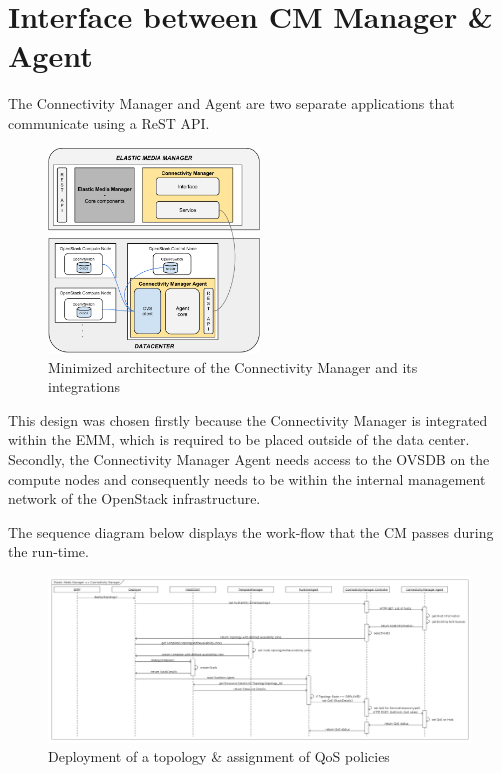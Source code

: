 \section{Interface between CM Manager \& Agent}

The Connectivity Manager and Agent are two separate applications that communicate using a ReST API. 

\begin{figure}[H]
\centering

\includegraphics[width=0.5\textwidth]{images/design/modular_architecture_cm_cma}

\caption{Minimized architecture of the Connectivity Manager and its integrations}
\end{figure}

This design was chosen firstly because the Connectivity Manager is integrated within the EMM, which is required to be placed outside of the data center. Secondly, the Connectivity Manager Agent needs access to the OVSDB on the compute nodes and consequently needs to be within the internal management network of the OpenStack infrastructure.

The sequence diagram below displays the work-flow that the CM passes during the run-time.

\begin{figure}[H]
\centering

\includegraphics[width=\textwidth]{images/design/sequence_diagram}

\caption{Deployment of a topology \& assignment of QoS policies}
\end{figure}

